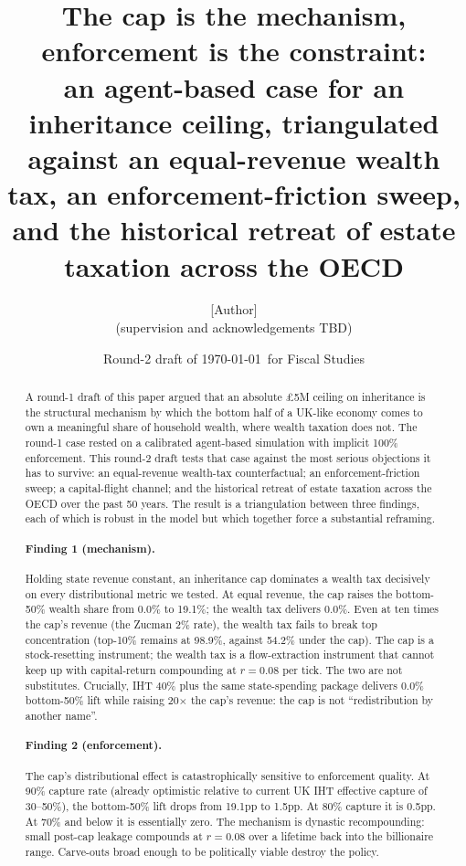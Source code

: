 \documentclass[11pt]{article}
\title{The cap is the mechanism, enforcement is the constraint:\\
\large an agent-based case for an inheritance ceiling, triangulated
against an equal-revenue wealth tax, an enforcement-friction sweep,
and the historical retreat of estate taxation across the OECD}
\author{[Author]\\
\small (supervision and acknowledgements TBD)}
\date{Round-2 draft of \today\ for Fiscal Studies}
\begin{document}
\maketitle

\begin{abstract}
A round-1 draft of this paper argued that an absolute \pounds 5M
ceiling on inheritance is the structural mechanism by which the
bottom half of a UK-like economy comes to own a meaningful share of
household wealth, where wealth taxation does not.  The round-1 case
rested on a calibrated agent-based simulation with implicit 100\%
enforcement.  This round-2 draft tests that case against the most
serious objections it has to survive: an equal-revenue wealth-tax
counterfactual; an enforcement-friction sweep; a capital-flight
channel; and the historical retreat of estate taxation across the
OECD over the past 50 years.  The result is a triangulation between
three findings, each of which is robust in the model but which
together force a substantial reframing.

\paragraph{Finding 1 (mechanism).}  Holding state revenue constant,
an inheritance cap dominates a wealth tax decisively on every
distributional metric we tested.  At equal revenue, the cap raises
the bottom-50\% wealth share from 0.0\% to 19.1\%; the wealth tax
delivers 0.0\%.  Even at ten times the cap's revenue (the Zucman 2\%
rate), the wealth tax fails to break top concentration (top-10\%
remains at 98.9\%, against 54.2\% under the cap).  The cap is a
stock-resetting instrument; the wealth tax is a flow-extraction
instrument that cannot keep up with capital-return compounding at
$r=0.08$ per tick.  The two are not substitutes.  Crucially, IHT 40\%
plus the same state-spending package delivers 0.0\% bottom-50\% lift
while raising 20$\times$ the cap's revenue: the cap is not
``redistribution by another name''.

\paragraph{Finding 2 (enforcement).}  The cap's distributional effect
is catastrophically sensitive to enforcement quality.  At 90\%
capture rate (already optimistic relative to current UK IHT
effective capture of 30--50\%), the bottom-50\% lift drops from
19.1pp to 1.5pp.  At 80\% capture it is 0.5pp.  At 70\% and below
it is essentially zero.  The mechanism is dynastic recompounding:
small post-cap leakage compounds at $r=0.08$ over a lifetime back
into the billionaire range.  Carve-outs broad enough to be
politically viable destroy the policy.


\end{abstract}
\end{document}
